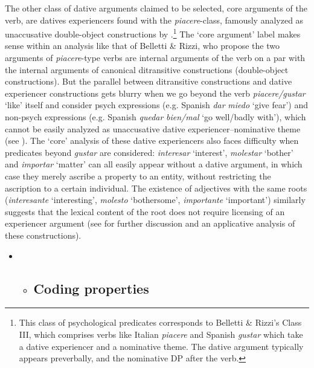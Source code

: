 \documentclass[output=paper,modfonts,nonflat]{langsci/langscibook}
\begin{document}
The other class of dative arguments claimed to be selected, core arguments of the verb, are datives experiencers found with the \textit{piacere}{}-class, famously analyzed as unaccusative double-object constructions by \citealt{BellettiRizzi1988}.\footnote{This class of psychological predicates corresponds to Belletti \& Rizzi’s Class III, which comprises verbs like Italian \textit{piacere} and Spanish \textit{gustar} which take a dative experiencer and a nominative theme. The dative argument typically appears preverbally, and the nominative DP after the verb.}  The ‘core argument’ label makes sense within an analysis like that of Belletti \& Rizzi, who propose the two arguments of \textit{piacere}{}-type verbs are internal arguments of the verb on a par with the internal arguments of canonical ditransitive constructions (double-object constructions).  But the parallel between ditransitive constructions and dative experiencer constructions gets blurry when we go beyond the verb \textit{piacere/gustar} ‘like’ itself and consider psych expressions (e.g. Spanish \textit{dar} \textit{miedo} ‘give fear’) and non-psych expressions (e.g. Spanish \textit{quedar} \textit{bien/mal} ‘go well/badly with’), which cannot be easily analyzed as unaccusative dative experiencer–nominative theme (see \citealt{Cuervo2011}). The ‘core’ analysis of these dative experiencers also faces difficulty when predicates beyond \textit{gustar} are considered: \textit{interesar} ‘interest’, \textit{molestar} ‘bother’ and \textit{importar} ‘matter’ can all easily appear without a dative argument, in which case they merely ascribe a property to an entity, without restricting the ascription to a certain individual. The existence of adjectives with the same roots (\textit{interesante} ‘interesting’, \textit{molesto} ‘bothersome’, \textit{importante} ‘important’) similarly suggests that the lexical content of the root does not require licensing of an experiencer argument (see  for further discussion and an applicative analysis of these constructions).

\begin{itemize}
\item \begin{itemize}
\item \subsection{Coding properties}
\end{itemize}
\end{itemize}
\end{document}
